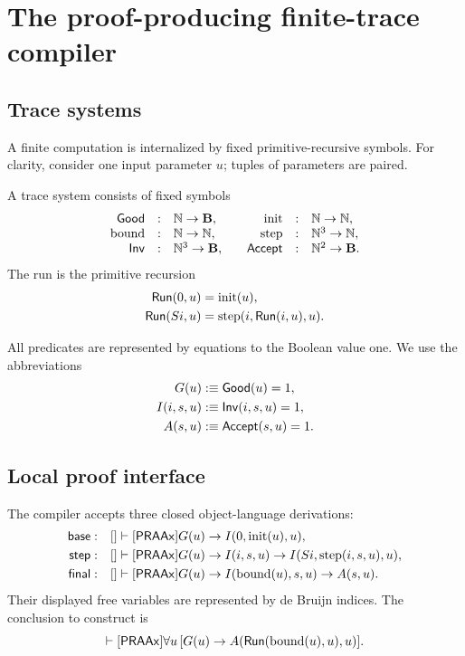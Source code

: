 \section{The proof-producing finite-trace compiler}
\label{sec:tracecompiler}

\subsection{Trace systems}

A finite computation is internalized by fixed primitive-recursive symbols.
For clarity, consider one input parameter \(u\); tuples of parameters are
paired.

\begin{definition}
A trace system consists of fixed symbols
\[
\begin{array}{rclcrcl}
 \mathsf{Good}&:&\mathbb N\to\mathbf B, && \operatorname{init}&:&\mathbb N\to\mathbb N,\\
 \operatorname{bound}&:&\mathbb N\to\mathbb N, &&
 \operatorname{step}&:&\mathbb N^3\to\mathbb N,\\
 \mathsf{Inv}&:&\mathbb N^3\to\mathbf B, &&
 \mathsf{Accept}&:&\mathbb N^2\to\mathbf B.
\end{array}
\]
The run is the primitive recursion
\begin{align*}
 \mathsf{Run}(0,u)&=\operatorname{init}(u),\\
 \mathsf{Run}(Si,u)&=\operatorname{step}(i,\mathsf{Run}(i,u),u).
\end{align*}
\end{definition}

All predicates are represented by equations to the Boolean value one.  We use
the abbreviations
\[
\begin{aligned}
 G(u)&:\equiv \mathsf{Good}(u)=1,\\
 I(i,s,u)&:\equiv \mathsf{Inv}(i,s,u)=1,\\
 A(s,u)&:\equiv \mathsf{Accept}(s,u)=1.
\end{aligned}
\]

\subsection{Local proof interface}

The compiler accepts three closed object-language derivations:
\begin{align}
 \mathsf{base}:&\quad []\vdash[\mathsf{PRAAx}]
       G(u)\to I(0,\operatorname{init}(u),u),\label{eq:tracebase}\\
 \mathsf{step}:&\quad []\vdash[\mathsf{PRAAx}]
       G(u)\to I(i,s,u)\to
       I(Si,\operatorname{step}(i,s,u),u),\label{eq:tracestep}\\
 \mathsf{final}:&\quad []\vdash[\mathsf{PRAAx}]
       G(u)\to I(\operatorname{bound}(u),s,u)\to A(s,u).
       \label{eq:tracefinal}
\end{align}
Their displayed free variables are represented by de Bruijn indices.  The
conclusion to construct is
\begin{equation}
 []\vdash[\PRAAx]
 \forall u\,[G(u)\to
 A(\Run(\operatorname{bound}(u),u),u)].
 \label{eq:traceresult}
\end{equation}

